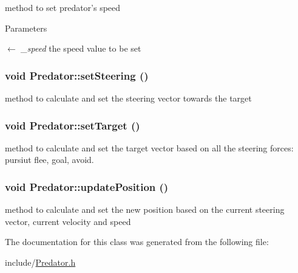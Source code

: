 method to set predator's speed 
\begin{DoxyParams}{Parameters}
\item[\mbox{$\leftarrow$} {\em \_\-speed}]the speed value to be set \end{DoxyParams}
\hypertarget{classPredator_a8f2a2bec2b92689dbd78a6081269e7cb}{
\subsubsection[{setSteering}]{\setlength{\rightskip}{0pt plus 5cm}void Predator::setSteering ()}}
\label{classPredator_a8f2a2bec2b92689dbd78a6081269e7cb}


method to calculate and set the steering vector towards the target \hypertarget{classPredator_a0c4314fa80d722c9ab993f9503e78c97}{
\subsubsection[{setTarget}]{\setlength{\rightskip}{0pt plus 5cm}void Predator::setTarget ()}}
\label{classPredator_a0c4314fa80d722c9ab993f9503e78c97}


method to calculate and set the target vector based on all the steering forces: pursiut flee, goal, avoid. \hypertarget{classPredator_a6bafa78814bd9b01178afb95aec24359}{
\subsubsection[{updatePosition}]{\setlength{\rightskip}{0pt plus 5cm}void Predator::updatePosition ()}}
\label{classPredator_a6bafa78814bd9b01178afb95aec24359}


method to calculate and set the new position based on the current steering vector, current velocity and speed 

The documentation for this class was generated from the following file:\begin{DoxyCompactItemize}
\item 
include/\hyperlink{Predator_8h}{Predator.h}\end{DoxyCompactItemize}
